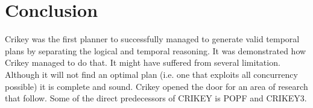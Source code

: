 \documentclass
[a4paper
,english
,parskip=half
,bibliography=totoc
]{scrreprt}
\begin{document}
    \section{Conclusion} 
    Crikey was the first planner to successfully managed to generate valid temporal plans by separating the logical and temporal reasoning. It was demonstrated how Crikey managed to do that. It might have suffered from several limitation. Although it will not find an optimal plan (i.e. one that exploits all concurrency possible) it is complete and sound. Crikey opened the door for an area of research that follow. Some of the direct predecessors of CRIKEY is POPF and CRIKEY3.




\listoffigures



\end{document}
